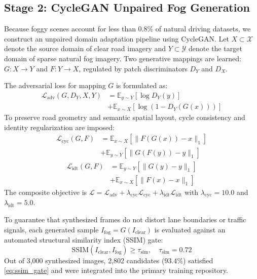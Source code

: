 \documentclass[conference]{IEEEtran}
\begin{document}
\subsection{Stage 2: CycleGAN Unpaired Fog Generation}
Because foggy scenes account for less than 0.8\% of natural driving datasets, we construct an unpaired domain adaptation pipeline using CycleGAN. Let $X \subset \mathcal{X}$ denote the source domain of clear road imagery and $Y \subset \mathcal{Y}$ denote the target domain of sparse natural fog imagery. Two generative mappings are learned: $G: X \to Y$ and $F: Y \to X$, regulated by patch discriminators $D_Y$ and $D_X$.

The adversarial loss for mapping $G$ is formulated as:
\begin{align}
\mathcal{L}_{\text{adv}}(G, D_Y, X, Y) &= \mathbb{E}_{y \sim Y}[\log D_Y(y)] \nonumber \\
&+ \mathbb{E}_{x \sim X}[\log(1 - D_Y(G(x)))]
\label{eq:cyclegan_adv}
\end{align}
To preserve road geometry and semantic spatial layout, cycle consistency and identity regularization are imposed:
\begin{align}
\mathcal{L}_{\text{cyc}}(G, F) &= \mathbb{E}_{x \sim X}[\|F(G(x)) - x\|_1] \nonumber \\
&+ \mathbb{E}_{y \sim Y}[\|G(F(y)) - y\|_1]
\label{eq:cyclegan_cyc}
\end{align}
\begin{align}
\mathcal{L}_{\text{idt}}(G, F) &= \mathbb{E}_{y \sim Y}[\|G(y) - y\|_1] \nonumber \\
&+ \mathbb{E}_{x \sim X}[\|F(x) - x\|_1]
\label{eq:cyclegan_idt}
\end{align}
The composite objective is $\mathcal{L} = \mathcal{L}_{\text{adv}} + \lambda_{\text{cyc}}\mathcal{L}_{\text{cyc}} + \lambda_{\text{idt}}\mathcal{L}_{\text{idt}}$ with $\lambda_{\text{cyc}} = 10.0$ and $\lambda_{\text{idt}} = 5.0$.

To guarantee that synthesized frames do not distort lane boundaries or traffic signals, each generated sample $I_{\text{fog}} = G(I_{\text{clear}})$ is evaluated against an automated structural similarity index (SSIM) gate:
\begin{equation}
\text{SSIM}(I_{\text{clear}}, I_{\text{fog}}) \ge \tau_{\text{sim}}, \quad \tau_{\text{sim}} = 0.72
\label{eq:ssim_gate}
\end{equation}
Out of 3,000 synthesized images, 2,802 candidates ($93.4\%$) satisfied \eqref{eq:ssim_gate} and were integrated into the primary training repository.
\end{document}
